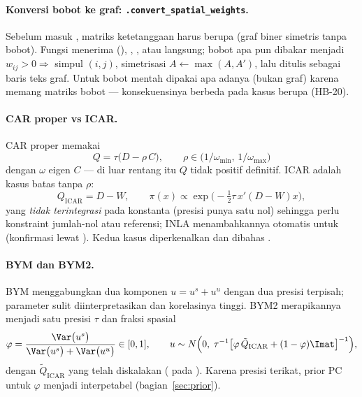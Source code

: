 \paragraph{Konversi bobot ke graf: \texttt{.convert\_spatial\_weights}.}
\label{sec:bayes-w}
Sebelum masuk , matriks ketetanggaan harus berupa
 (graf biner simetris tanpa bobot). Fungsi
 menerima  (),
, , atau  langsung; bobot apa pun
dibakar menjadi $w_{ij}>0\Rightarrow$ simpul $(i,j)$, simetrisasi
$A\leftarrow\max(A,A')$, lalu ditulis sebagai baris teks graf. Untuk
 bobot mentah dipakai apa adanya (bukan graf) karena
 memang matriks bobot --- konsekuensinya berbeda pada
kasus  berupa  (HB-20).

\paragraph{CAR proper vs ICAR.} CAR proper memakai
\begin{equation}
  Q=\tau\bigl(D-\rho\,C\bigr),\qquad
  \rho\in\bigl(1/\omega_{\min},\,1/\omega_{\max}\bigr)
  \label{eq:car-proper}
\end{equation}
dengan $\omega$ eigen $C$ --- di luar rentang itu $Q$ tidak positif
definitif. ICAR adalah kasus batas tanpa $\rho$:
\begin{equation}
  Q_{\text{ICAR}}=D-W,\qquad
  \pi(x)\propto\exp\bigl(-\tfrac12\tau\,x'(D-W)x\bigr),
  \label{eq:icar}
\end{equation}
yang \emph{tidak terintegrasi} pada konstanta (presisi punya satu nol) sehingga
perlu konstraint jumlah-nol atau referensi; INLA menambahkannya otomatis
untuk  (konfirmasi lewat ).
Kedua kasus diperkenalkan \citet{besag1974spatial} dan dibahas
\citet{banerjee2014hierarchical}.

\paragraph{BYM dan BYM2.}\label{sec:bym2} BYM \citep{besag1991bayesian} menggabungkan dua
komponen $u=u^{s}+u^{u}$ dengan dua presisi terpisah; parameter sulit
diinterpretasikan dan korelasinya tinggi. BYM2 \citep{riebler2016intuitive}
merapikannya menjadi satu presisi $\tau$ dan fraksi spasial
\begin{equation}
  \varphi=\frac{\Var\bigl(u^{s}\bigr)}
  {\Var\bigl(u^{s}\bigr)+\Var\bigl(u^{u}\bigr)}\in[0,1],
  \qquad
  u\sim N\Bigl(0,\;\tau^{-1}\bigl[\varphi\,\tilde Q_{\text{ICAR}}
  +(1-\varphi)\Imat\bigr]^{-1}\Bigr),
  \label{eq:bym2}
\end{equation}
dengan $\tilde Q_{\text{ICAR}}$ yang telah diskalakan
\citep{sorbye2014scaling} ( pada
). Karena presisi terikat, prior PC untuk $\varphi$ menjadi
interpetabel (bagian~\ref{sec:prior}).

